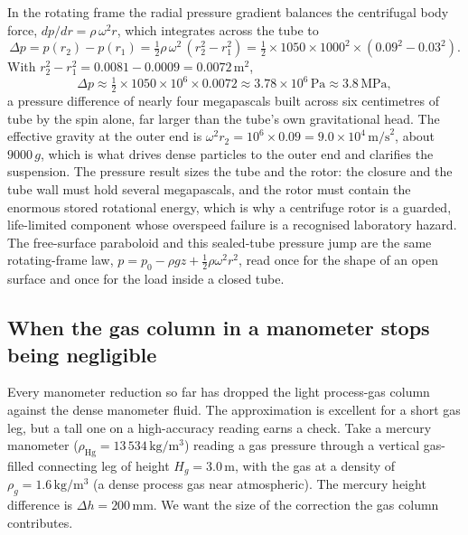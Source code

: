 In the rotating frame the radial pressure gradient balances the centrifugal
body force, $dp/dr = \rho\,\omega^2 r$, which integrates across the tube to
\[
\Delta p = p(r_2) - p(r_1)
= \tfrac12 \rho\,\omega^2\,(r_2^2 - r_1^2)
= \tfrac12 \times 1050 \times 1000^2 \times (0.09^2 - 0.03^2).
\]
With $r_2^2 - r_1^2 = 0.0081 - 0.0009 = 0.0072\,\text{m}^2$,
\[
\Delta p \approx \tfrac12 \times 1050 \times 10^6 \times 0.0072
\approx 3.78 \times 10^6\,\text{Pa}
\approx 3.8\,\text{MPa},
\]
a pressure difference of nearly four megapascals built across six
centimetres of tube by the spin alone, far larger than the tube's own
gravitational head. The effective gravity at the outer end is $\omega^2 r_2
= 10^6 \times 0.09 = 9.0 \times 10^4\,\text{m/s}^2$, about $9000\,g$, which
is what drives dense particles to the outer end and clarifies the
suspension. The pressure result sizes the tube and the rotor: the closure
and the tube wall must hold several megapascals, and the rotor must contain
the enormous stored rotational energy, which is why a centrifuge rotor is a
guarded, life-limited component whose overspeed failure is a recognised
laboratory hazard. The free-surface paraboloid and this sealed-tube
pressure jump are the same rotating-frame law, $p = p_0 - \rho g z +
\tfrac12\rho\omega^2 r^2$, read once for the shape of an open surface and
once for the load inside a closed tube.

\subsection{When the gas column in a manometer stops being negligible}

Every manometer reduction so far has dropped the light process-gas column
against the dense manometer fluid. The approximation is excellent for a
short gas leg, but a tall one on a high-accuracy reading earns a check.
Take a mercury manometer ($\rho_{\text{Hg}} = 13\,534\,\si{\kilogram\per
\meter\cubed}$) reading a gas pressure through a vertical gas-filled
connecting leg of height $H_g = 3.0\,\si{\meter}$, with the gas at a density
of $\rho_g = 1.6\,\si{\kilogram\per\meter\cubed}$ (a dense process gas near
atmospheric). The mercury height difference is $\Delta h = 200\,\si{
\milli\meter}$. We want the size of the correction the gas column
contributes.

